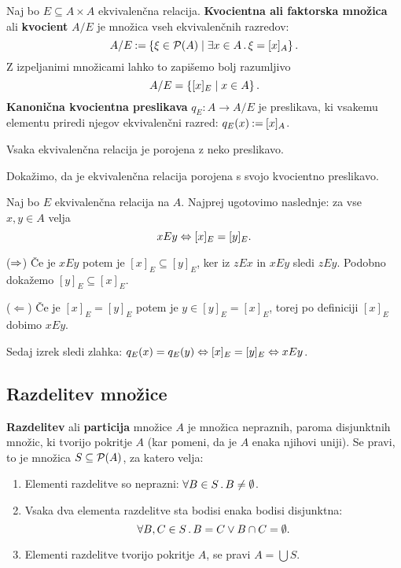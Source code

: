 \begin{definicija}
  Naj bo $E \subseteq A \times A$ ekvivalenčna relacija. \textbf{Kvocientna ali faktorska množica} ali \textbf{kvocient} $A/E$ je množica vseh ekvivalenčnih razredov:
  \begin{equation*}
    A/E \mathbin{{:}{=}} \left\{ \xi \in \mathcal{P}(A) \; \middle| \; \exists x \in A \,.\, \xi = [x]_A \right\}.
  \end{equation*}
  Z izpeljanimi množicami lahko to zapišemo bolj razumljivo
  \begin{equation*}
    A/E = \left\{ [x]_E \; \middle| \; x \in A \right\}.
  \end{equation*}
  \textbf{Kanonična kvocientna preslikava} $q_E : A \to A/E$ je preslikava, ki vsakemu elementu
  priredi njegov ekvivalenčni razred: $q_E(x) \mathbin{{:}{=}} [x]_A$.
\end{definicija}

\begin{izrek}
  Vsaka ekvivalenčna relacija je porojena z neko preslikavo.
\end{izrek}

\begin{dokaz}
  Dokažimo, da je ekvivalenčna relacija porojena s svojo kvocientno preslikavo.

  Naj bo $E$ ekvivalenčna relacija na $A$. Najprej ugotovimo naslednje: za vse $x,
  y \in A$ velja
  \begin{equation*}
    x E y \Leftrightarrow [x]_E = [y]_E.
  \end{equation*}

  ($\Rightarrow$) Če je $x E y$ potem je $[x]_E \subseteq [y]_E$, ker iz $z E x$ in $x E y$ sledi $z E y$.
  Podobno dokažemo $[y]_E \subseteq [x]_E$.

  ($\Leftarrow$) Če je $[x]_E = [y]_E$ potem je $y \in [y]_E = [x]_E$, torej po definiciji $[x]_E$
  dobimo $x E y$.

  Sedaj izrek sledi zlahka: $q_E(x) = q_E(y) \Leftrightarrow [x]_E = [y]_E \Leftrightarrow x E y$.
\end{dokaz}


\subsection{Razdelitev množice}

\begin{definicija}
  \textbf{Razdelitev} ali \textbf{particija} množice $A$ je množica nepraznih, paroma
  disjunktnih množic, ki tvorijo pokritje $A$ (kar pomeni, da je $A$ enaka njihovi uniji). Se
  pravi, to je množica $S \subseteq \mathcal{P}(A)$, za katero velja:
  \begin{enumerate}
  \item Elementi razdelitve so neprazni: $\forall B \in S \,.\, B \neq \emptyset$.
  \item Vsaka dva elementa razdelitve sta bodisi enaka bodisi disjunktna:
    \begin{equation*}
      \forall B, C \in S \,.\, B = C \lor B \cap C = \emptyset.
    \end{equation*}
  \item Elementi razdelitve tvorijo pokritje $A$, se pravi $A = \bigcup S$.
  \end{enumerate}
\end{definicija}

